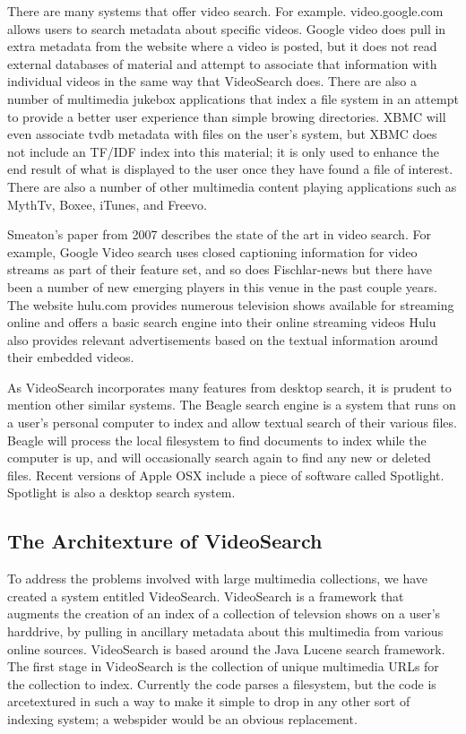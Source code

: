 \documentclass{acm_proc_article-sp}
\begin{document}
    There are many systems that offer video search.  For example. video.google.com allows users to search metadata about specific videos.  Google video does pull in extra metadata from the website where a video is posted, but it does not read external databases of material and attempt to associate that information with individual videos in the same way that VideoSearch does.  There are also a number of multimedia jukebox applications that index a file system in an attempt to provide a better user experience than simple browing directories. XBMC will even associate tvdb metadata with files on the user’s system\cite{goodwin2010appliance}, but XBMC does not include an TF/IDF index into this material; it is only used to enhance the end result of what is displayed to the user once they have found a file of interest. There are also a number of other multimedia content playing applications such as MythTv, Boxee, iTunes, and Freevo.\cite{schopman2010notube}

    Smeaton’s paper from 2007 describes the state of the art in video search. \cite{smeaton2007techniques} For example, Google Video search uses closed captioning information for video streams as part of their feature set, and so does Fischlar-news \cite{lee2006user} but there have been a number of new emerging players in this venue in the past couple years.  The website hulu.com provides numerous television shows available for streaming online and offers a basic search engine into their online streaming videos \cite{patent:20100287474} Hulu also provides relevant advertisements based on the textual information around their embedded videos.

    As VideoSearch incorporates many features from desktop search, it is prudent to mention other similar systems.  The Beagle search engine is a system that runs on a user’s personal computer to index and allow textual search of their various files.  \cite{brunkhorst2006beagle++}  Beagle will process the local filesystem to find documents to index while the computer is up, and will occasionally search again to find any new or deleted files.  Recent versions of Apple OSX include a piece of software called Spotlight.\cite{applex} Spotlight is also a desktop search system.


\subsection{The Architexture of VideoSearch}
    To address the problems involved with large multimedia collections, we have created a system entitled VideoSearch.  VideoSearch is a framework that augments the creation of an index of a collection of televsion shows on a user’s harddrive, by pulling in ancillary metadata about this multimedia from various online sources.  VideoSearch is based around the Java Lucene search framework.  The first stage in VideoSearch is the collection of unique multimedia URLs for the collection to index. Currently the code parses a filesystem, but the code is arcetextured in such a way to make it simple to drop in any other sort of indexing system; a webspider would be an obvious replacement.  
\end{document}
